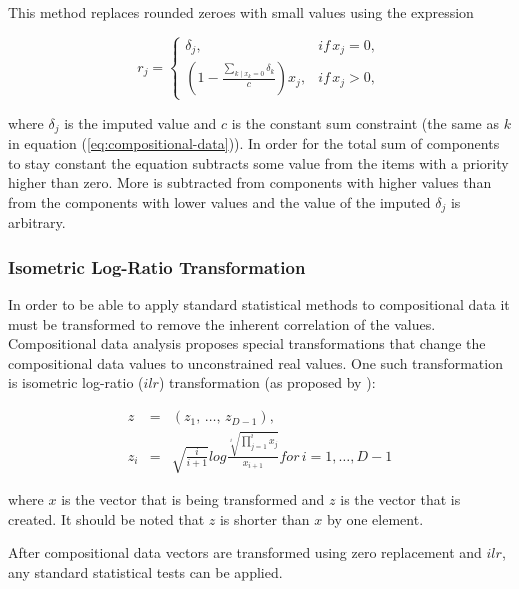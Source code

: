 This method replaces rounded zeroes with small values using the expression

\begin{equation}
r_{j}=\begin{cases}
\delta_{j}, & if\, x_{j}=0,\\
(1-\frac{\sum_{k\mid x_{k}=0}\delta_{k}}{c})x_{j}, & if\, x_{j}>0,\end{cases}\label{eq:zero-replace}
\end{equation}

where $\delta_{j}$ is the imputed value and $c$ is the constant sum constraint (the same as $k$ in equation (\ref{eq:compositional-data})).
In order for the total sum of components to stay constant the equation subtracts some value from
the items with a priority higher than zero.
More is subtracted from components with higher values than from the components with lower values and the value of the imputed $\delta_{j}$ is arbitrary.

\subsubsection{\label{Isometric-Logratio-Transformation}Isometric Log-Ratio Transformation}

In order to be able to apply standard statistical methods to compositional data it must be transformed to remove the inherent correlation of the values.
Compositional data analysis proposes special transformations that change the compositional data values to unconstrained real values.
One such transformation is isometric log-ratio ($ilr$) transformation (as proposed by \citep{Pawlowsky-Glahn2006,Filzmoser2007a}):

\begin{eqnarray}
z & = & \left(z_{1},\,\ldots,\, z_{D-1}\right),\nonumber \\
z_{i} & = & \sqrt{\frac{i}{i+1}}log\frac{\sqrt[i]{\prod_{j=1}^{i}x_{j}}}{x_{i+1}}for\, i=1,\ldots,D-1\label{eq:ilr}
\end{eqnarray}

where $x$ is the vector that is being transformed and $z$ is the vector that is created. It should be noted that $z$ is shorter than $x$ by one element.

After compositional data vectors are transformed using zero replacement and $ilr$, any standard statistical tests can be applied.